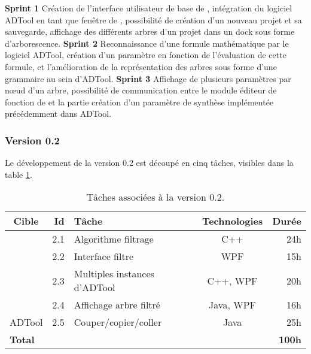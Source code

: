             \noindent\textbf{Sprint 1} Création de l'interface utilisateur de base de \glasir{}, intégration du logiciel ADTool en tant que fenêtre de \glasir{}, possibilité de création d'un nouveau projet et sa sauvegarde, affichage des différents arbres d'un projet dans un dock sous forme d'arborescence.\newline
            \textbf{Sprint 2} Reconnaissance d'une formule mathématique par le logiciel ADTool, création d'un paramètre en fonction de l'évaluation de cette formule, et l'amélioration de la représentation des arbres sous forme d'une grammaire au sein d'ADTool.\newline
            \textbf{Sprint 3} Affichage de plusieurs paramètres par nœud d'un arbre, possibilité de communication entre le module éditeur de fonction de \glasir{} et la partie création d'un paramètre de synthèse implémentée précédemment dans ADTool.\newline


        \subsubsection{Version 0.2}
            Le développement de la version 0.2 est découpé en cinq tâches, visibles dans la {\sc table} \ref{tab:taches_units_2}.
            \begin{table}[h]
                \centering
                \begin{tabular}{|c|r|l|c|r|}
                    \hline
                    \textbf{Cible} & \textbf{Id} & \textbf{Tâche} & \textbf{Technologies} & \textbf{Durée}\\
                    \hline

                    \multirow{4}{*}{\glasir{}} & 2.1 & Algorithme filtrage & C++ & 24h\\
                    \cline{2-5}
                     & 2.2 & Interface filtre & WPF & 15h\\
                    \cline{2-5}
                     & 2.3 & Multiples instances d'ADTool & C++, WPF & 20h\\
                    \cline{2-5}
                     & 2.4 & Affichage arbre filtré & Java, WPF & 16h\\
                    \hline

                    \multirow{1}{*}{ADTool} & 2.5 & Couper/copier/coller & \multirow{1}{*}{Java} & 25h\\
                    \hline

                    \multicolumn{4}{|l|}{\bf Total} & {\bf 100h}\\
                    \hline
                \end{tabular}
                \caption{Tâches associées à la version 0.2.}
                \label{tab:taches_units_2}
            \end{table}
            
